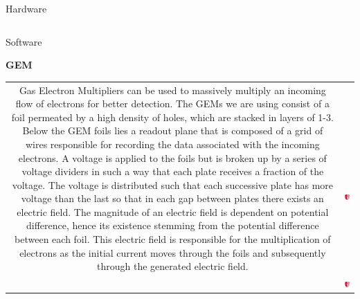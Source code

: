 \documentclass[landscape,a0paper,fontscale=0.285]{baposter} %
\begin{document}
\begin{poster}
\begin{posterbox}[name=hardware,column=0,span=2,row=0,bottomaligned=diagrams]{Hardware}
\begin{center}
\begin{tabular}{  c c }
	\end{tabular}
	\end{center}


\end{posterbox}


\begin{posterbox}[name=software,column=3,span=2,row=0,bottomaligned=diagrams]{Software}

	\begin{center}
		\textbf{\huge{GEM}}
	\end{center}
		
	\begin{center}
	\begin{tabular}{  c c }
	\multirow{2}{*}{ \parbox{8cm}{
	\indent Gas Electron Multipliers can be used to massively multiply an incoming flow of electrons for better detection. The GEMs we are using consist of a foil permeated by a high density of holes, which are stacked in layers of 1-3. Below the GEM foils lies a readout plane that is composed of a grid of wires responsible for recording the data associated with the incoming electrons. A voltage is applied to the foils but is broken up by a series of voltage dividers in such a way that each plate receives a fraction of the voltage. The voltage is distributed such that each successive plate has more voltage than the last so that in each gap between plates there exists an electric field. The magnitude of an electric field is dependent on potential difference, hence its existence stemming from the potential difference between each foil. This electric field is responsible for the multiplication of electrons as the initial current moves through the foils and subsequently through the generated electric field. 
	}} & \\
	 & \includegraphics[width=3cm]{sheild} \\
	 &  \includegraphics[width=3cm]{sheild} \\
	

\end{tabular}
\end{center}
\end{posterbox}
\end{poster}
\end{document}
